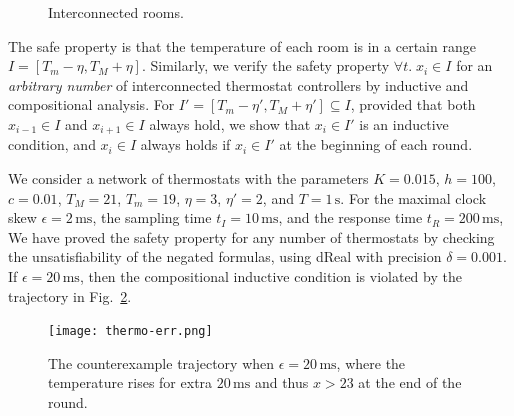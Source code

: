 \begin{figure}
\centering
{}
\caption{Interconnected rooms. %
} \label{fig:adj-rooms}
\end{figure}

The safe property is that the temperature of each room
is in a certain range $I = [T_m - \eta, T_M + \eta]$.
Similarly, we verify the safety property $\forall t.\; x_i \in I$
for an \emph{arbitrary number} of interconnected thermostat controllers
by inductive and compositional analysis.
For %
$I' = [T_m - \eta', T_M + \eta']\subseteq I$,
provided that both $x_{i-1} \in I$ and $x_{i+1} \in I$ always hold,
we show that $x_i \in I'$ is an inductive condition,
and $x_i \in I$ always holds
if $x_i \in I'$ at the beginning of each round.


We consider a network of thermostats with the parameters 
$K = 0.015$, 
$h = 100$,
$c = 0.01$,
$T_M = 21$, 
$T_m = 19$,
$\eta = 3$, $\eta' = 2$,
and $T = 1\,\mathrm{s}$.
For the maximal clock skew $\epsilon = 2\,\mathrm{ms}$,
the sampling time $t_I = 10\,\mathrm{ms}$,
and the response time $t_R = 200\,\mathrm{ms}$,
We have proved the safety property for any number of thermostats 
by checking the unsatisfiability of the negated formulas,
 using \textsf{dReal} with precision $\delta = 0.001$.
%
If $\epsilon = 20\,\mathrm{ms}$,
then the compositional inductive condition is violated by the trajectory in Fig.~\ref{fig:thermo-error}.


\begin{figure}
\centering
\texttt{[image: thermo-err.png]}    
\caption{The counterexample trajectory when $\epsilon = 20\,\mathrm{ms}$,
where the temperature  rises for extra $20\,\mathrm{ms}$ and thus $x > 23$ at the end of the round.} \label{fig:thermo-error}
\end{figure}


%







